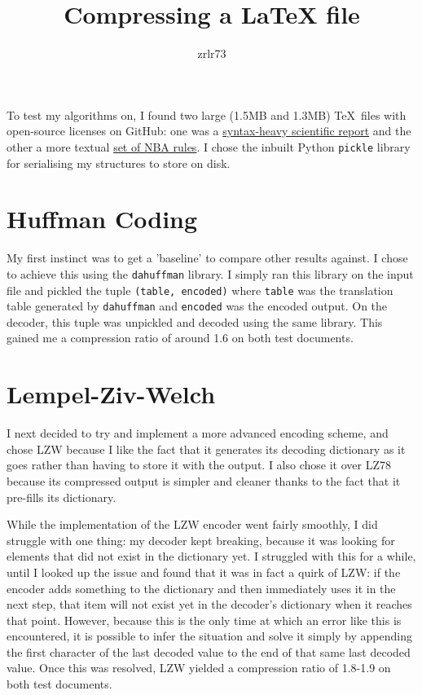 \documentclass[11pt]{article} %
\title{\vspace{-1.6cm}Compressing a LaTeX file}
\author{zrlr73}
\date{} %
\begin{document}
\maketitle


	To test my algorithms on, I found two large (1.5MB and 1.3MB) \rmfamily\TeX\normalfont\ files with open-source licenses on GitHub: one was a \href{https://github.com/robertgj/DesignOfIIRFilters/blob/master/DesignOfIIRFilters.tex}{syntax-heavy scientific report} and the other a more textual \href{https://github.com/atlhawksfanatic/NBA-CBA/blob/master/docs/nba-cba-2017.tex}{set of NBA rules}. I chose the inbuilt Python \verb|pickle| library for serialising my structures to store on disk.


\section{Huffman Coding}

My first instinct was to get a 'baseline' to compare other results against. I chose to achieve this using the \verb|dahuffman| library. I simply ran this library on the input file and pickled the tuple \verb|(table, encoded)| where \verb|table| was the translation table generated by \verb|dahuffman| and \verb|encoded| was the encoded output. On the decoder, this tuple was unpickled and decoded using the same library. This gained me a compression ratio of around 1.6 on both test documents.


\section{Lempel-Ziv-Welch}

I next decided to try and implement a more advanced encoding scheme, and chose LZW because I like the fact that it generates its decoding dictionary as it goes rather than having to store it with the output. I also chose it over LZ78 because its compressed output is simpler and cleaner thanks to the fact that it pre-fills its dictionary.

While the implementation of the LZW encoder went fairly smoothly, I did struggle with one thing: my decoder kept breaking, because it was looking for elements that did not exist in the dictionary yet. I struggled with this for a while, until I looked up the issue and found that it was in fact a quirk of LZW: if the encoder adds something to the dictionary and then immediately uses it in the next step, that item will not exist yet in the decoder's dictionary when it reaches that point. However, because this is the only time at which an error like this is encountered, it is possible to infer the situation and solve it simply by appending the first character of the last decoded value to the end of that same last decoded value. Once this was resolved, LZW yielded a compression ratio of 1.8-1.9 on both test documents.
\end{document}
